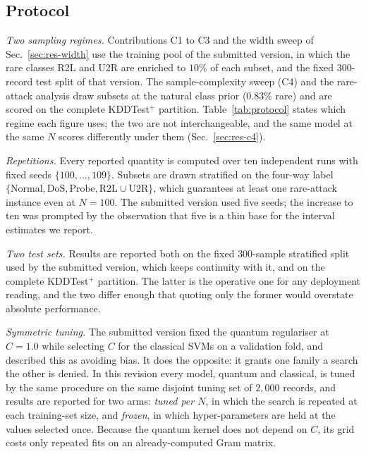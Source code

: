 \subsection{Protocol}

\begin{revbody}


\emph{Two sampling regimes.} Contributions C1 to C3 and the width sweep of
Sec.~\ref{sec:res-width} use the training pool of the submitted version, in
which the rare classes R2L and U2R are enriched to $10\%$ of each subset, and
the fixed $300$-record test split of that version. The sample-complexity sweep
(C4) and the rare-attack analysis draw subsets at the natural class prior
($0.83\%$ rare) and are scored on the complete KDDTest$^+$ partition.
Table~\ref{tab:protocol} states which regime each figure uses; the two are not
interchangeable, and the same model at the same $N$ scores differently under
them (Sec.~\ref{sec:res-c4}).

\emph{Repetitions.} Every reported quantity is computed over ten independent
runs with fixed seeds $\{100,\dots,109\}$. Subsets are drawn stratified on the
four-way label $\{\text{Normal},\text{DoS},\text{Probe},\text{R2L}\cup
\text{U2R}\}$, which guarantees at least one rare-attack instance even at
$N=100$. The submitted version used five seeds; the increase to ten was
prompted by the observation that five is a thin base for the interval estimates
we report.

\emph{Two test sets.} Results are reported both on the fixed $300$-sample
stratified split used by the submitted version, which keeps continuity with it,
and on the complete KDDTest$^+$ partition. The latter is the operative one for
any deployment reading, and the two differ enough that quoting only the former
would overstate absolute performance.

\emph{Symmetric tuning.} The submitted version fixed the quantum regulariser at
$C=1.0$ while selecting $C$ for the classical SVMs on a validation fold, and
described this as avoiding bias. It does the opposite: it grants one family a
search the other is denied. In this revision every model, quantum and classical,
is tuned by the same procedure on the same disjoint tuning set of $2{,}000$
records, and results are reported for two arms: \emph{tuned per $N$}, in
which the search is repeated at each training-set size, and \emph{frozen}, in
which hyper-parameters are held at the values selected once. Because the
quantum kernel does not depend on $C$, its grid costs only repeated fits on an
already-computed Gram matrix.


\end{revbody}
